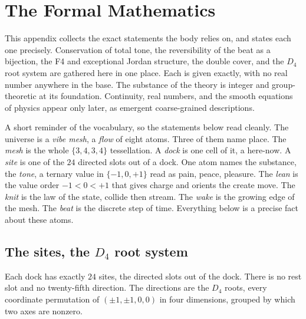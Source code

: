 \section{The Formal Mathematics}

This appendix collects the exact statements the body relies on, and states each one precisely. Conservation of total tone, the reversibility of the beat as a bijection, the F4 and exceptional Jordan structure, the double cover, and the $D_4$ root system are gathered here in one place. Each is given exactly, with no real number anywhere in the base. The substance of the theory is integer and group-theoretic at its foundation. Continuity, real numbers, and the smooth equations of physics appear only later, as emergent coarse-grained descriptions.

A short reminder of the vocabulary, so the statements below read cleanly. The universe is a \emph{vibe mesh}, a \emph{flow} of eight atoms. Three of them name place. The \emph{mesh} is the whole $\{3,4,3,4\}$ tessellation. A \emph{dock} is one cell of it, a here-now. A \emph{site} is one of the $24$ directed slots out of a dock. One atom names the substance, the \emph{tone}, a ternary value in $\{-1,0,+1\}$ read as pain, peace, pleasure. The \emph{lean} is the value order $-1 < 0 < +1$ that gives charge and orients the create move. The \emph{knit} is the law of the state, collide then stream. The \emph{wake} is the growing edge of the mesh. The \emph{beat} is the discrete step of time. Everything below is a precise fact about these atoms.

\subsection{The sites, the $D_4$ root system}

Each dock has exactly $24$ sites, the directed slots out of the dock. There is no rest slot and no twenty-fifth direction. The directions are the $D_4$ roots, every coordinate permutation of $(\pm 1, \pm 1, 0, 0)$ in four dimensions, grouped by which two axes are nonzero.

